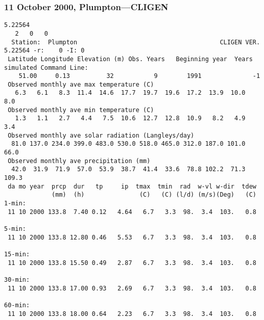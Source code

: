 \subsubsection{11 October 2000, Plumpton---CLIGEN}
\label{sec:PlumptonTemporalScaleSimulationCLIGEN}
\begin{verbatim}
5.22564
   2   0   0
  Station:  Plumpton                                       CLIGEN VER. 5.22564 -r:    0 -I: 0
 Latitude Longitude Elevation (m) Obs. Years   Beginning year  Years simulated Command Line:
    51.00     0.13          32           9        1991              -1          
 Observed monthly ave max temperature (C)
   6.3   6.1   8.3  11.4  14.6  17.7  19.7  19.6  17.2  13.9  10.0   8.0
 Observed monthly ave min temperature (C)
   1.3   1.1   2.7   4.4   7.5  10.6  12.7  12.8  10.9   8.2   4.9   3.4
 Observed monthly ave solar radiation (Langleys/day)
  81.0 137.0 234.0 399.0 483.0 530.0 518.0 465.0 312.0 187.0 101.0  66.0
 Observed monthly ave precipitation (mm)
  42.0  31.9  71.9  57.0  53.9  38.7  41.4  33.6  78.8 102.2  71.3 109.3
 da mo year  prcp  dur   tp     ip  tmax  tmin  rad  w-vl w-dir  tdew
             (mm)  (h)               (C)   (C) (l/d) (m/s)(Deg)   (C)
1-min:
 11 10 2000 133.8  7.40 0.12   4.64   6.7   3.3  98.  3.4  103.   0.8

5-min:
 11 10 2000 133.8 12.80 0.46   5.53   6.7   3.3  98.  3.4  103.   0.8

15-min:
 11 10 2000 133.8 15.50 0.49   2.87   6.7   3.3  98.  3.4  103.   0.8

30-min:
 11 10 2000 133.8 17.00 0.93   2.69   6.7   3.3  98.  3.4  103.   0.8

60-min:
 11 10 2000 133.8 18.00 0.64   2.23   6.7   3.3  98.  3.4  103.   0.8
\end{verbatim}


